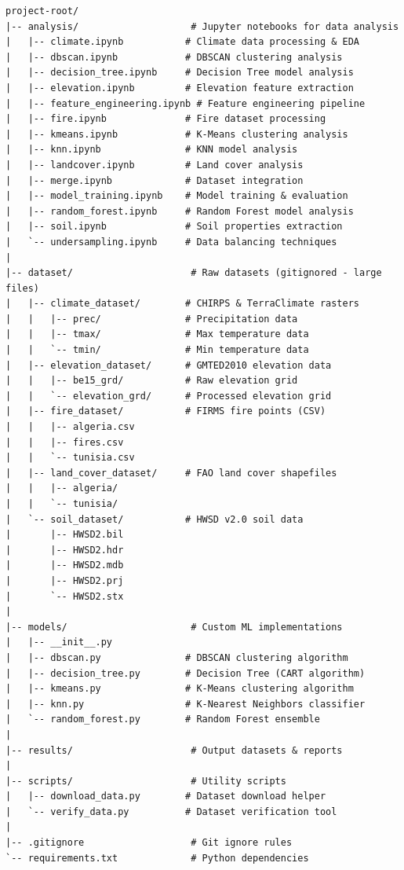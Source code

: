 \begin{verbatim}
project-root/
|-- analysis/                    # Jupyter notebooks for data analysis
|   |-- climate.ipynb           # Climate data processing & EDA
|   |-- dbscan.ipynb            # DBSCAN clustering analysis
|   |-- decision_tree.ipynb     # Decision Tree model analysis
|   |-- elevation.ipynb         # Elevation feature extraction
|   |-- feature_engineering.ipynb # Feature engineering pipeline
|   |-- fire.ipynb              # Fire dataset processing
|   |-- kmeans.ipynb            # K-Means clustering analysis
|   |-- knn.ipynb               # KNN model analysis
|   |-- landcover.ipynb         # Land cover analysis
|   |-- merge.ipynb             # Dataset integration
|   |-- model_training.ipynb    # Model training & evaluation
|   |-- random_forest.ipynb     # Random Forest model analysis
|   |-- soil.ipynb              # Soil properties extraction
|   `-- undersampling.ipynb     # Data balancing techniques
|
|-- dataset/                     # Raw datasets (gitignored - large files)
|   |-- climate_dataset/        # CHIRPS & TerraClimate rasters
|   |   |-- prec/               # Precipitation data
|   |   |-- tmax/               # Max temperature data
|   |   `-- tmin/               # Min temperature data
|   |-- elevation_dataset/      # GMTED2010 elevation data
|   |   |-- be15_grd/           # Raw elevation grid
|   |   `-- elevation_grd/      # Processed elevation grid
|   |-- fire_dataset/           # FIRMS fire points (CSV)
|   |   |-- algeria.csv
|   |   |-- fires.csv
|   |   `-- tunisia.csv
|   |-- land_cover_dataset/     # FAO land cover shapefiles
|   |   |-- algeria/
|   |   `-- tunisia/
|   `-- soil_dataset/           # HWSD v2.0 soil data
|       |-- HWSD2.bil
|       |-- HWSD2.hdr
|       |-- HWSD2.mdb
|       |-- HWSD2.prj
|       `-- HWSD2.stx
|
|-- models/                      # Custom ML implementations
|   |-- __init__.py
|   |-- dbscan.py               # DBSCAN clustering algorithm
|   |-- decision_tree.py        # Decision Tree (CART algorithm)
|   |-- kmeans.py               # K-Means clustering algorithm
|   |-- knn.py                  # K-Nearest Neighbors classifier
|   `-- random_forest.py        # Random Forest ensemble
|
|-- results/                     # Output datasets & reports
|
|-- scripts/                     # Utility scripts
|   |-- download_data.py        # Dataset download helper
|   `-- verify_data.py          # Dataset verification tool
|
|-- .gitignore                   # Git ignore rules
`-- requirements.txt             # Python dependencies
\end{verbatim}

